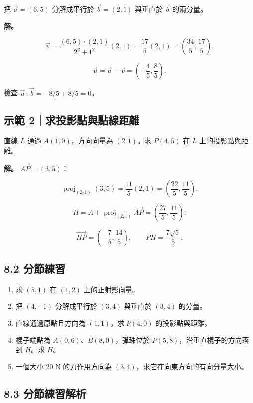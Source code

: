 \documentclass[11pt,a4paper]{article}
\providecommand{\tightlist}{%
  \setlength{\itemsep}{0pt}\setlength{\parskip}{0pt}}
\begin{document}
把 \(\vec a=(6,5)\) 分解成平行於 \(\vec b=(2,1)\) 與垂直於 \(\vec b\) 的兩分量。

\textbf{解。}

\[
\vec v=\frac{(6,5)\cdot(2,1)}{2^2+1^2}(2,1)
=\frac{17}{5}(2,1)=\left(\frac{34}{5},\frac{17}{5}\right).
\]

\[
\vec u=\vec a-\vec v
=\left(-\frac45,\frac85\right).
\]

檢查 \(\vec u\cdot\vec b=-8/5+8/5=0\)。

\subsection{示範 2｜求投影點與點線距離}\label{ux793aux7bc4-2ux6c42ux6295ux5f71ux9edeux8207ux9edeux7ddaux8dddux96e2}

直線 \(L\) 通過 \(A(1,0)\)，方向向量為 \((2,1)\)。求 \(P(4,5)\) 在 \(L\) 上的投影點與距離。

\textbf{解。} \(\overrightarrow{AP}=(3,5)\)：

\[
\operatorname{proj}_{(2,1)}(3,5)
=\frac{11}{5}(2,1)=\left(\frac{22}{5},\frac{11}{5}\right).
\]

\[
H=A+\operatorname{proj}_{(2,1)}\overrightarrow{AP}
=\left(\frac{27}{5},\frac{11}{5}\right).
\]

\[
\overrightarrow{HP}=\left(-\frac75,\frac{14}{5}\right),\qquad
PH=\frac{7\sqrt5}{5}.
\]

\subsection{8.2 分節練習}\label{ux5206ux7bc0ux7df4ux7fd2-7}

\begin{enumerate}
\def\labelenumi{\arabic{enumi}.}
\tightlist
\item
  求 \((5,1)\) 在 \((1,2)\) 上的正射影向量。
\item
  把 \((4,-1)\) 分解成平行於 \((3,4)\) 與垂直於 \((3,4)\) 的分量。
\item
  直線通過原點且方向為 \((1,1)\)，求 \(P(4,0)\) 的投影點與距離。
\item
  棍子端點為 \(A(0,6)\)、\(B(8,0)\)，彈珠位於 \(P(5,8)\)，沿垂直棍子的方向落到 \(H\)。求 \(H\)。
\item
  一個大小 \(20\text{ N}\) 的力作用方向為 \((3,4)\)，求它在向東方向的有向分量大小。
\end{enumerate}

\subsection{8.3 分節練習解析}\label{ux5206ux7bc0ux7df4ux7fd2ux89e3ux6790-7}
\end{document}
